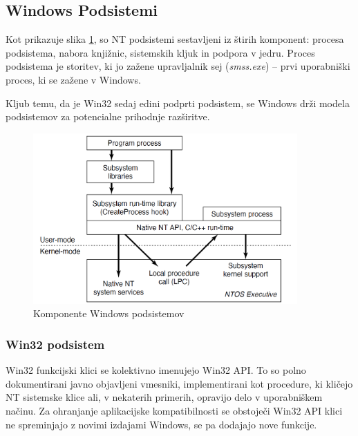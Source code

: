 \documentclass[a4paper,12pt,openright]{book}
\begin{document}
\subsection{Windows Podsistemi}

Kot prikazuje slika \ref{fig:windows_subsystems_components}, so NT podsistemi sestavljeni iz štirih komponent: procesa podsistema, nabora knjižnic, sistemskih kljuk in podpora v jedru.
Proces podsistema je storitev, ki jo zažene upravljalnik sej (\textit{smss.exe}) -- prvi uporabniški proces, ki se zažene v Windows.

Kljub temu, da je Win32 sedaj edini podprti podsistem, se Windows drži modela podsistemov za potencialne prihodnje razširitve.
\cite{Tanenbaum_Bos_2023}

\begin{figure}[h!]
	\begin{center}
		\includegraphics[width=0.9\textwidth]{images/windows_subsystems_components.png}
	\end{center}
	\caption{Komponente Windows podsistemov \cite{Tanenbaum_Bos_2023}}
	\label{fig:windows_subsystems_components}
\end{figure}

\subsubsection{Win32 podsistem}

Win32 funkcijski klici se kolektivno imenujejo Win32 API.
To so polno dokumentirani javno objavljeni vmesniki, implementirani kot procedure, ki kličejo NT sistemske klice ali, v nekaterih primerih, opravijo delo v uporabniškem načinu.
Za ohranjanje aplikacijske kompatibilnosti se obstoječi Win32 API klici ne spreminjajo z novimi izdajami Windows, se pa dodajajo nove funkcije.
\end{document}
